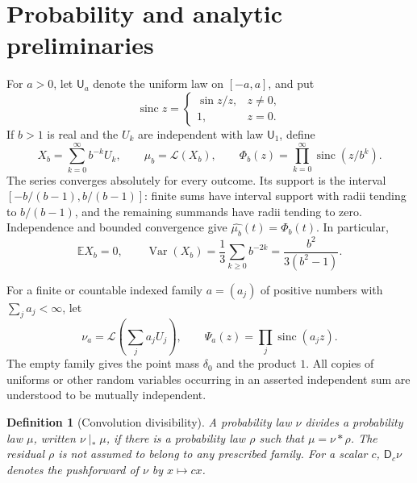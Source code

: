 \documentclass[11pt,a4paper]{article}
\newtheorem{definition}[theorem]{Definition}
\theoremstyle{remark}
\newcommand{\E}{\mathbb E}
\newcommand{\Law}{\mathcal L}
\newcommand{\sinc}{\operatorname{sinc}}
\newcommand{\Unif}{\mathsf U}
\newcommand{\dil}[1]{\mathsf D_{#1}}
\newcommand{\cf}[1]{\widehat{#1}}
\DeclareMathOperator{\Var}{Var}
\begin{document}
\section{Probability and analytic preliminaries}
\label{sec:prelim}

For $a>0$, let $\Unif_a$ denote the uniform law on $[-a,a]$, and put
\[
 \sinc z=\begin{cases}\sin z/z,&z\ne0,\\1,&z=0.\end{cases}
\]
If $b>1$ is real and the $U_k$ are independent with law $\Unif_1$, define
\begin{equation}
 X_b=\sum_{k=0}^{\infty}b^{-k}U_k,
 \qquad \mu_b=\Law(X_b),
 \qquad \Phi_b(z)=\prod_{k=0}^{\infty}\sinc(z/b^k).
 \label{eq:base-law}
\end{equation}
The series converges absolutely for every outcome. Its support is the interval
$[-b/(b-1),b/(b-1)]$: finite sums have interval support with radii tending to
$b/(b-1)$, and the remaining summands have radii tending to zero. Independence
and bounded convergence give $\cf{\mu_b}(t)=\Phi_b(t)$. In particular,
\begin{equation}
 \E X_b=0,
 \qquad \Var(X_b)=\frac13\sum_{k\ge0}b^{-2k}
                 =\frac{b^2}{3(b^2-1)}.
 \label{eq:variance}
\end{equation}

For a finite or countable indexed family $a=(a_j)$ of positive numbers with
$\sum_j a_j<\infty$, let
\begin{equation}
 \nu_a=\Law\left(\sum_j a_jU_j\right),
 \qquad \Psi_a(z)=\prod_j\sinc(a_jz).
 \label{eq:uniform-source}
\end{equation}
The empty family gives the point mass $\delta_0$ and the product $1$.
All copies of uniforms or other random variables occurring in an asserted
independent sum are understood to be mutually independent.

\begin{definition}[Convolution divisibility]
A probability law $\nu$ divides a probability law $\mu$, written $\nu\mid_*\mu$,
if there is a probability law $\rho$ such that $\mu=\nu*\rho$.
The residual $\rho$ is not assumed to belong to any prescribed family.
For a scalar $c$, $\dil c\nu$ denotes the pushforward of $\nu$ by $x\mapsto cx$.
\end{definition}
\end{document}
